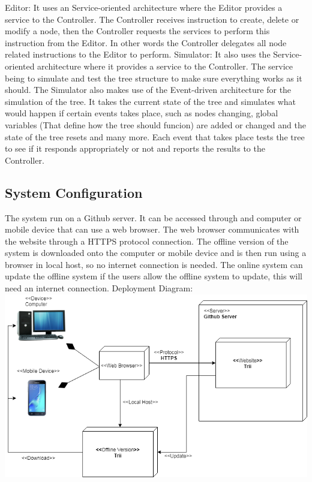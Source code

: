 \documentclass{article}
\begin{document}
    Editor: It uses an Service-oriented architecture where the Editor provides a service to the Controller. The Controller receives instruction to create, delete or modify a node, then the Controller requests the services to perform this instruction from the Editor. In other words the Controller delegates all node related instructions to the Editor to perform.\newline \newline 
    Simulator: It also uses the Service-oriented architecture where it provides a service to the Controller. The service being to simulate and test the tree structure to make sure everything works as it should. The Simulator also makes use of the Event-driven architecture for the simulation of the tree. It takes the current state of the tree and simulates what would happen if certain events takes place, such as nodes changing, global variables (That define how the tree should funcion) are added or changed and the state of the tree resets and many more. Each event that takes place tests the tree to see if it responds appropriately or not and reports the results to the Controller.

  \subsection{System Configuration} 
    The system run on a Github server. It can be accessed through and computer or mobile device that can use a web browser. The web browser communicates with the website through a HTTPS protocol connection. The offline version of the system is downloaded onto the computer or mobile device and is then run using a browser in local host, so no internet connection is needed. The online system can update the offline system if the users allow the offline system to update, this will need an internet connection.\newline \newline 
    Deployment Diagram:
    \includegraphics{TriiDeploymentDiagram}
\end{document}
